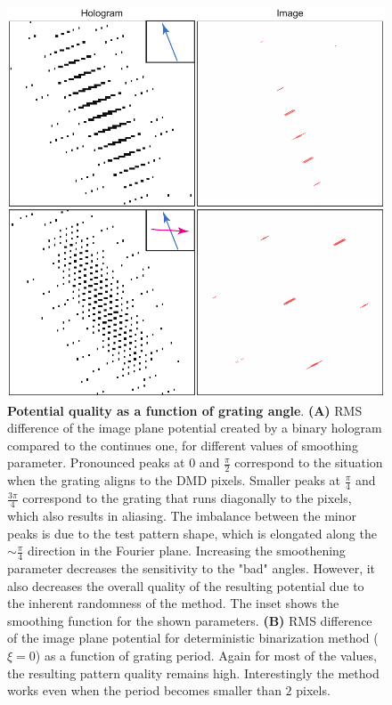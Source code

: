 \begin{figure}[t]
	\centering
	\includegraphics[scale=1]{figures/DMD_grating_bad_angle.pdf}
	\caption{{\bf Potential quality as a function of grating angle}. {\bf (A)} RMS difference of the image plane potential created by a binary hologram compared to the continues one, for different values of smoothing parameter. Pronounced peaks at $0$ and $\frac{\pi}{2}$ correspond to the situation when the grating aligns to the DMD pixels. Smaller peaks at $\frac{\pi}{4}$ and $\frac{3\pi}{4}$ correspond to the grating that runs diagonally to the pixels, which also results in aliasing. The imbalance between the minor peaks is due to the test pattern shape, which is elongated along the $\sim \frac{\pi}{4}$ direction in the Fourier plane. Increasing the smoothening parameter decreases the sensitivity to the "bad" angles. However, it also decreases the overall quality of the resulting potential due to the inherent randomness of the method. The inset shows the smoothing function for the shown parameters. {\bf (B)} RMS difference of the image plane potential for deterministic binarization method ($\xi = 0$) as a function of grating period. Again for most of the values, the resulting pattern quality remains high. Interestingly the method works even when the period becomes smaller than $2$ pixels.}
	\label{fig:DMD_grating_bad_angle}
\end{figure}

